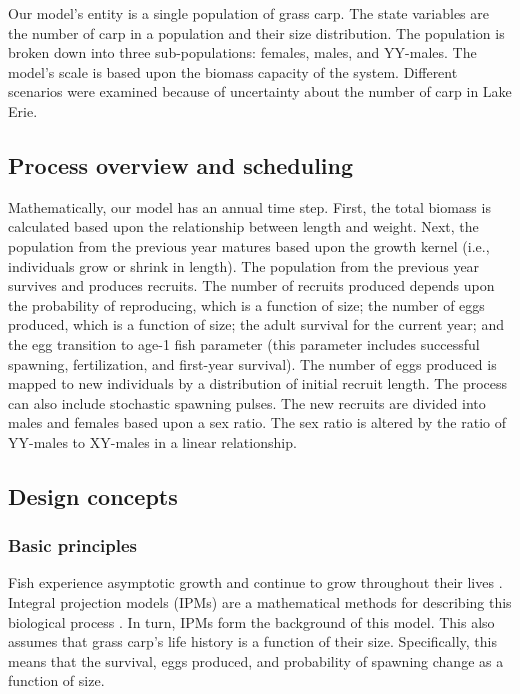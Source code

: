 \documentclass{article}[12pt]
\begin{document}
Our model's entity is a single population of grass carp.
The state variables are the number of carp in a population and their size distribution. 
The population is broken down into three sub-populations: females, males, and YY-males.
The model's scale is based upon the biomass capacity of the system.
Different scenarios were examined because of uncertainty about the number of carp in Lake Erie. 

\subsection{Process overview and scheduling}

Mathematically, our model has an annual time step.
First, the total biomass is calculated based upon the relationship between length and weight. 
Next, the population from the previous year matures based upon the growth kernel (i.e., individuals grow or shrink in length). 
The population from the previous year survives and produces recruits. 
The number of recruits produced depends upon the probability of reproducing, which is a function of size; the number of eggs produced, which is a function of size; the adult survival for the current year; and the egg transition to age-1 fish parameter (this parameter includes successful spawning, fertilization, and first-year survival).
The number of eggs produced is mapped to new individuals by a distribution of initial recruit length.
The process can also include stochastic spawning pulses.
The new recruits are divided into males and females based upon a sex ratio.
The sex ratio is altered by the ratio of YY-males to XY-males in a linear relationship. 



\subsection{Design concepts}

\subsubsection{Basic principles}\label{sec:bp}

Fish experience asymptotic growth and continue to grow throughout their lives \citep{lagler1962john}.
Integral projection models (IPMs) are a mathematical methods for describing this biological process \citep{ellner2006integral, merow2014advancing}.
In turn, IPMs form the background of this model. 
This also assumes that grass carp's life history is a function of their size. 
Specifically, this means that the survival, eggs produced, and probability of spawning change as a function of size. 
\end{document}
